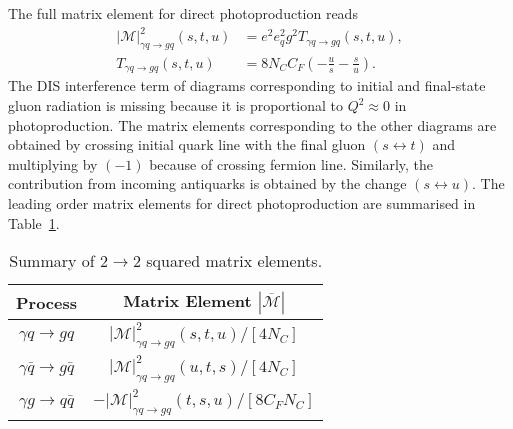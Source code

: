 The full matrix element for direct photoproduction reads
\begin{align}
 \left| \mathcal{M} \right|^2_{\gamma q \rightarrow gq} \left(s,t,u\right) &= e^2e^2_qg^2T_{\gamma q \rightarrow gq}\left(s,t,u\right),\\
  T_{\gamma q \rightarrow gq}\left(s,t,u\right) &= 8N_CC_F\left( -\frac{u}{s} - \frac{s}{u} \right).
\end{align}
The DIS interference term of diagrams corresponding to initial and final-state gluon radiation is missing because it is proportional to $Q^2\approx 0$ in photoproduction. The matrix elements corresponding to the other diagrams are obtained by crossing initial quark line with the final gluon $\left(s\leftrightarrow t \right)$ and multiplying by $\left(-1\right)$ because of crossing fermion line. Similarly, the contribution from incoming antiquarks is obtained by the change $\left(s\leftrightarrow u \right)$. The leading order matrix elements for direct photoproduction are summarised in Table~\ref{tab:ampdirect}. 

\begin{table}[h]
\begin{center}
\begin{tabular}{|c|c|}
\hline
Process & Matrix Element $\left|\overline{\mathcal{M}}\right|$ \\
\hline
$\gamma q \rightarrow g q$ & $ \left| \mathcal{M} \right|^2_{\gamma q \rightarrow g q} \left(s,t,u \right) / \left[4N_C\right] $\\
$\gamma \bar{q} \rightarrow g \bar{q}$ & $ \left| \mathcal{M} \right|^2_{\gamma q \rightarrow g q} \left(u,t,s \right) / \left[4N_C\right] $\\
$\gamma g \rightarrow q \bar{q}$ & $ -\left| \mathcal{M} \right|^2_{\gamma q \rightarrow g q} \left(t,s,u \right) / \left[8 C_F N_C\right] $ \\
\hline
 
\end{tabular}
\caption{Summary of $2\rightarrow 2$ squared matrix elements.}
\label{tab:ampdirect}
\end{center}  
\end{table}

